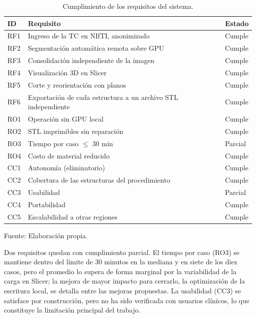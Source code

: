 \begin{table}[H]
  \centering
  \caption{Cumplimiento de los requisitos del sistema.}
  \vspace{5pt}
  \label{tab:cumplimiento}
  \small
  \begin{tabular}{p{1.1cm} p{8.6cm} p{2.4cm}}
    \hline
    \textbf{ID} & \textbf{Requisito} & \textbf{Estado} \\
    \hline
    RF1 & Ingreso de la TC en NIfTI, anonimizado & Cumple \\
    RF2 & Segmentación automática remota sobre GPU & Cumple \\
    RF3 & Consolidación independiente de la imagen & Cumple \\
    RF4 & Visualización 3D en Slicer & Cumple \\
    RF5 & Corte y reorientación con planos & Cumple \\
    RF6 & Exportación de cada estructura a un archivo STL independiente & Cumple \\
    RO1 & Operación sin GPU local & Cumple \\
    RO2 & STL imprimibles sin reparación & Cumple \\
    RO3 & Tiempo por caso $\leq$ 30 min & Parcial \\
    RO4 & Costo de material reducido & Cumple \\
    CC1 & Autonomía (eliminatorio) & Cumple \\
    CC2 & Cobertura de las estructuras del procedimiento & Cumple \\
    CC3 & Usabilidad & Parcial \\
    CC4 & Portabilidad & Cumple \\
    CC5 & Escalabilidad a otras regiones & Cumple \\
    \hline
  \end{tabular}
  \begin{minipage}{\textwidth}
    \centering
    \vspace{5pt}
    \normalsize Fuente: Elaboración propia.\\
  \end{minipage}
\end{table}

Dos requisitos quedan con cumplimiento parcial. El tiempo por caso (RO3) se mantiene dentro del límite de 30 minutos en la mediana y en siete de los diez casos, pero el promedio lo supera de forma marginal por la variabilidad de la carga en Slicer; la mejora de mayor impacto para cerrarlo, la optimización de la escritura local, se detalla entre las mejoras propuestas. La usabilidad (CC3) se satisface por construcción, pero no ha sido verificada con usuarios clínicos, lo que constituye la limitación principal del trabajo.\\

